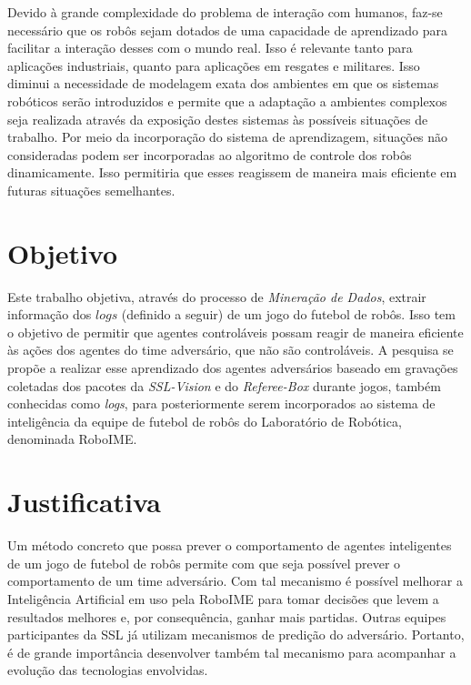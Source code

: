 
Devido à grande complexidade do problema de interação com humanos, faz-se necessário
que os robôs sejam dotados de uma capacidade de aprendizado para facilitar a interação
desses com o mundo real. Isso é relevante tanto para aplicações industriais, quanto para
aplicações em resgates e militares. Isso diminui a necessidade de modelagem
exata dos ambientes em que os sistemas robóticos serão introduzidos e permite que
a adaptação a ambientes complexos seja realizada através da exposição destes sistemas
às possíveis situações de trabalho. Por meio da incorporação do sistema de
aprendizagem, situações não consideradas podem ser incorporadas ao algoritmo de
controle dos robôs dinamicamente. Isso permitiria que esses reagissem de maneira mais
eficiente em futuras situações semelhantes.

\section{Objetivo}

Este trabalho objetiva, através do processo de \textit{Mineração de Dados}, extrair
informação dos $logs$ (definido a seguir) de um jogo do futebol de robôs.
Isso tem o objetivo de permitir que agentes controláveis
possam reagir de maneira eficiente às ações dos agentes do time adversário, que não são controláveis.
A pesquisa se propõe a realizar esse aprendizado dos agentes adversários baseado em gravações
coletadas dos pacotes da \textit{SSL-Vision} e do \textit{Referee-Box} durante jogos, também conhecidas
como \textit{logs}, para posteriormente serem incorporados ao sistema de inteligência da
equipe de futebol de robôs do Laboratório de Robótica, denominada RoboIME.

\section{Justificativa}%

Um método concreto que possa prever o comportamento de agentes inteligentes de um jogo de
futebol de robôs permite com que seja possível prever o comportamento de um time adversário.
Com tal mecanismo é possível melhorar a Inteligência Artificial em uso pela RoboIME
para tomar decisões que levem a resultados melhores e, por consequência, ganhar mais partidas.
Outras equipes participantes da SSL já utilizam mecanismos de predição do adversário.
Portanto, é de grande importância desenvolver também tal mecanismo para acompanhar a evolução
das tecnologias envolvidas.

